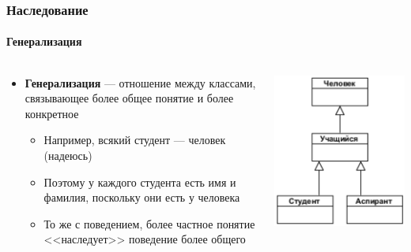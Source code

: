 \documentclass[xetex,mathserif,serif]{beamer}
\begin{document}
    \begin{frame}
        \frametitle{Наследование}
        \framesubtitle{Генерализация}
        \begin{columns}
            \begin{column}{0.75\textwidth}
                \begin{itemize}
                    \item \textbf{Генерализация} --- отношение между классами, связывающее более общее понятие и более конкретное
                    \begin{itemize}
                        \item Например, всякий студент --- человек (надеюсь)
                        \item Поэтому у каждого студента есть имя и фамилия, поскольку они есть у человека
                        \item То же с поведением, более частное понятие <<наследует>> поведение более общего
                    \end{itemize}
                \end{itemize}
            \end{column}
            \begin{column}{0.25\textwidth}
                \includegraphics[width=\textwidth]{inheritance.png}
            \end{column}
        \end{columns}
    \end{frame}
\end{document}
